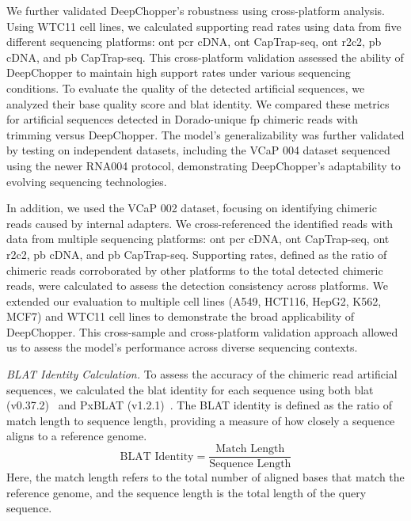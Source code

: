 \documentclass[pdflatex,sn-nature, lineno]{sn-jnl}%
\theoremstyle{thmstyleone}%
\theoremstyle{thmstyletwo}%
\theoremstyle{thmstylethree}%
\begin{document}
We further validated DeepChopper's robustness using cross-platform analysis.
Using WTC11 cell lines, we calculated supporting read rates using data from five different sequencing platforms: \gls{ont} \gls{pcr} cDNA, \gls{ont} CapTrap-seq, \gls{ont} \gls{r2c2}, \gls{pb} cDNA, and \gls{pb} CapTrap-seq.
This cross-platform validation assessed the ability of DeepChopper to maintain high support rates under various sequencing conditions.
To evaluate the quality of the detected artificial sequences, we analyzed their base quality score and \gls{blat} identity.
We compared these metrics for artificial sequences detected in Dorado-unique \gls{fp} chimeric reads with trimming versus DeepChopper.
The model's generalizability was further validated by testing on independent datasets, including the VCaP 004 dataset sequenced using the newer RNA004 protocol, demonstrating DeepChopper's adaptability to evolving sequencing technologies.

In addition, we used the VCaP 002 dataset, focusing on identifying chimeric reads caused by internal adapters.
We cross-referenced the identified reads with data from multiple sequencing platforms: \gls{ont} \gls{pcr} cDNA, \gls{ont} CapTrap-seq, \gls{ont} \gls{r2c2}, \gls{pb} cDNA, and \gls{pb} CapTrap-seq.
Supporting rates, defined as the ratio of chimeric reads corroborated by other platforms to the total detected chimeric reads, were calculated to assess the detection consistency across platforms.
We extended our evaluation to multiple cell lines (A549, HCT116, HepG2, K562, MCF7) and WTC11 cell lines to demonstrate the broad applicability of DeepChopper.
This cross-sample and cross-platform validation approach allowed us to assess the model's performance across diverse sequencing contexts.

\textit{BLAT Identity Calculation.} To assess the accuracy of the chimeric read artificial sequences, we calculated the \gls{blat} identity for each sequence using both \gls{blat} (v0.37.2)~\cite{kent2002blat} and PxBLAT (v1.2.1)~\cite{li2024pxblat}.
The BLAT identity is defined as the ratio of match length to sequence length, providing a measure of how closely a sequence aligns to a reference genome.
\[
	\textrm{BLAT Identity} = \frac{\textrm{Match Length}}{\textrm{Sequence Length}}
\]
Here, the match length refers to the total number of aligned bases that match the reference genome, and the sequence length is the total length of the query sequence.

\end{document}
